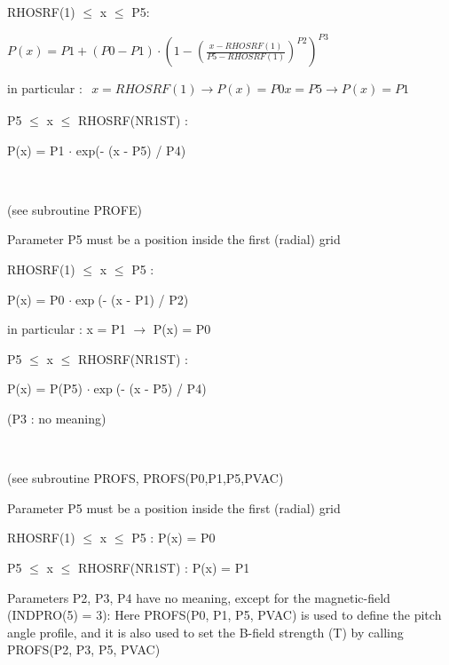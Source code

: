 \begin{description}
\begin{description}
                RHOSRF(1) $\le$ x $\le$ P5:

                $P(x) = P1+( P0 - P1 ) \cdot {\left ( 1 - {\left ( \frac{x - RHOSRF(1)}{P5 - RHOSRF(1)} \right )}^{P2} \right )}^{P3}$ 

                \medskip 

                in particular :  $
                  \begin{array}{l} x = RHOSRF(1)   \rightarrow  P(x) = P0

                    x = P5	 \rightarrow   P(x) = P1
                  \end{array}
                $ 

                \medskip 

                P5 $\le$ x $\le$ RHOSRF(NR1ST) :

                P(x) = P1  $\cdot$ exp(- (x - P5) / P4)
          \item[INDPRO = 2] ~ 

                (see subroutine PROFE) 

                Parameter P5 must be a position inside the first (radial) grid

                RHOSRF(1) $\le$ x $\le$ P5 :

                P(x) = P0  $\cdot \exp$(- (x - P1) / P2) 

                in particular : x = P1 $\rightarrow$ P(x) = P0 

                P5 $\le$ x $\le$ RHOSRF(NR1ST) :

                P(x) = P(P5)  $\cdot \exp$(- (x - P5) / P4) 

                (P3 : no meaning)
          \item[INDPRO = 3] ~ 

                (see subroutine PROFS, PROFS(P0,P1,P5,PVAC) 

                Parameter P5 must be a position inside the first (radial) grid

                RHOSRF(1) $\le$ x $\le$ P5 :	   P(x) = P0 

                P5 $\le$ x $\le$ RHOSRF(NR1ST) :    P(x) = P1 

                Parameters P2, P3, P4 have no meaning, except for the magnetic-field (INDPRO(5)
                = 3): Here PROFS(P0, P1, P5, PVAC) is used to define the pitch angle profile,
                and it is also used to set the B-field strength (\si{\tesla}) by calling
                PROFS(P2, P3, P5, PVAC) 


\end{description}
\end{description}

